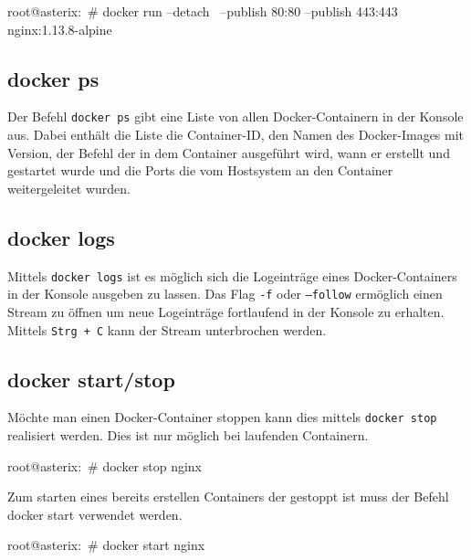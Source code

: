 \begin{bashcode}
  root@asterix:~# docker run --detach \
    --publish 80:80
    --publish 443:443
    nginx:1.13.8-alpine
\end{bashcode}

\subsection{docker ps}%
\label{sec:docker-befehle.ps}
Der Befehl \texttt{docker ps} gibt eine Liste von allen Docker-Containern in der Konsole aus. Dabei enthält die Liste die Container-ID, den Namen des Docker-Images mit Version, der Befehl der in dem Container ausgeführt wird, wann er erstellt und gestartet wurde und die Ports die vom Hostsystem an den Container weitergeleitet wurden.

\subsection{docker logs}%
\label{sec:docker-befehle.logs}
Mittels \texttt{docker logs} ist es möglich sich die Logeinträge eines Docker-Containers in der Konsole ausgeben zu lassen. Das Flag \texttt{-f} oder \texttt{--follow} ermöglich einen Stream zu öffnen um neue Logeinträge fortlaufend in der Konsole zu erhalten. Mittels \texttt{Strg + C} kann der Stream unterbrochen werden.

\subsection{docker start/stop}%
\label{sec:docker-befehle.start-stop}
Möchte man einen Docker-Container stoppen kann dies mittels \texttt{docker stop} realisiert werden. Dies ist nur möglich bei laufenden Containern.

\begin{bashcode}
   root@asterix:~# docker stop nginx
\end{bashcode}

Zum starten eines bereits erstellen Containers der gestoppt ist muss der Befehl docker start verwendet werden.

\begin{bashcode}
  root@asterix:~# docker start nginx
\end{bashcode}

